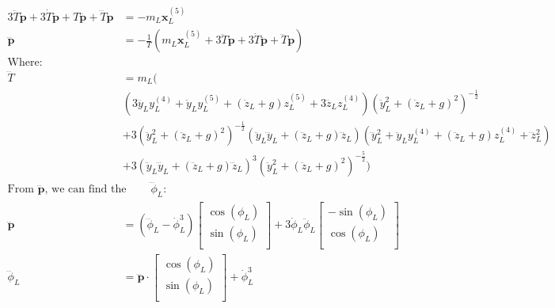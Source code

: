 \documentclass[11pt]{article}
\begin{document}
\begin{align*}
3 \ddot{T} \mathbf{\dot{p}} + 3 \dot{T} \mathbf{\ddot{p}} + T \mathbf{\dddot{p}} + \dddot{T} \mathbf{p} &= -m_L \mathbf{x}_L^{(5)} \\
\mathbf{\dddot{p}} &= - \frac{1}{T} \left( m_L \mathbf{x}_L^{(5)} + 3 \ddot{T} \mathbf{\dot{p}} + 3 \dot{T} \mathbf{\ddot{p}} + \dddot{T} \mathbf{p} \right) \\
\text{Where:} & \\
\dddot{T} &= m_L ( \\
& (3 \dddot{y}_L y_L^{(4)} + \ddot{y}_L y_L^{(5)} + (\ddot{z}_L + g) z_L^{(5)} + 3 \dddot{z}_L z_L^{(4)} ) ( \ddot{y}_L^2 + (\ddot{z}_L+g)^2)^{ -\frac{1}{2} } \\
& + 3 ( \ddot{y}_L^2 + (\ddot{z}_L+g)^2) ^{-\frac{1}{2}} (\ddot{y}_L \dddot{y}_L + (\ddot{z}_L+g) \dddot{z}_L) ( \dddot{y}_L^2 + \ddot{y}_L y_L^{(4)} + (\ddot{z}_L+g) z_L^{(4)} + \dddot{z}_L^2) \\
& + 3 ( \ddot{y}_L \dddot{y}_L + (\ddot{z}_L+g) \dddot{z}_L)^3 (\ddot{y}_L^2 + (\ddot{z}_L+g)^2 ) ^ {-\frac{5}{2}} ) \\
\text{From $\mathbf{\dddot{p}}$, we can find the state $\dddot{\phi}_L$: } & \\
\mathbf{\dddot{p}} &= (\dddot{\phi}_L - \dot{\phi}_L^3 )
\begin{bmatrix}
       \cos(\phi_L) \\
       \sin(\phi_L) \\
\end{bmatrix} 
 + 3 \dot{\phi}_L \ddot{\phi}_L
 \begin{bmatrix}
       -\sin(\phi_L) \\
       \cos(\phi_L) \\
\end{bmatrix} \\
\dddot{\phi}_L &= \mathbf{\dddot{p}} \cdot
\begin{bmatrix}
       \cos(\phi_L) \\
       \sin(\phi_L) \\
\end{bmatrix} 
+ \dot{\phi}_L^3
\end{align*}
\end{document}
